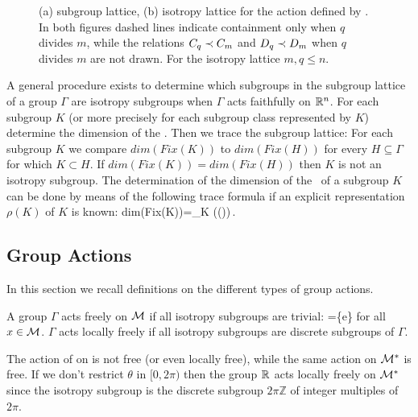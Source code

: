 \begin{example}
\begin{figure}
\begin{center}
\end{center}
\caption[O(2) lattices]{
    {\small
    (a)  subgroup lattice, (b)  isotropy lattice for the action
	defined by . In both figures dashed lines indicate
	containment only when $q$ divides $m$, while the relations $C_{q}\prec C_{m}$
	and $D_{q}\prec D_{m}$ when $q$ divides $m$ are not drawn. For the isotropy lattice $m,q\le n$.
	}}
\label{fig:O2lattice}
    \vspace*{-5pt}
\end{figure}

\end{example}

A general procedure exists \cite{gatermannHab} to determine which subgroups in the subgroup lattice of a group $\Gamma$ are isotropy
subgroups when $\Gamma$ acts faithfully on $\mathbb{R}^{n}$.
For each subgroup $K$ (or more precisely for each subgroup class represented by $K$)
determine the dimension of the \fixedsp. Then we trace the subgroup lattice: For each subgroup
$K$ we compare $dim(Fix(K))$ to $dim(Fix(H))$ for every $H\subseteq\Gamma$ for which $K\subset H$.
If  $dim(Fix(K))=dim(Fix(H))$ then $K$ is not an isotropy subgroup. The determination of the dimension of the
\fixedsp\ of a subgroup $K$ can be done by means of the following trace formula if an explicit representation
$\rho(K)$ of $K$ is known:
\beq
	dim(Fix(K))=\sum_{\kappa\in K} \trace(\rho(\kappa))\,.
\eeq

\subsection{Group Actions}

In this section we recall definitions on the different types of group actions.

\begin{definition}
\label{def:free}
A group $\Gamma$ acts freely on $\mathcal{M}$ if all isotropy subgroups are trivial: =\{e\} for all $x\in \mathcal{M}$.
$\Gamma$ acts locally freely if all isotropy subgroups are discrete subgroups of $\Gamma$.
\end{definition}

\begin{example}
The action  of  on  is not free (or even locally free), while the same action on $\mathcal{M}^*$ is free. If we don't
restrict $\theta$ in $[0,2\pi)$ then the group $\mathbb{R}^{}$ acts locally freely on $\mathcal{M}^*$
since the isotropy subgroup is the discrete subgroup $2\pi\mathbb{Z}$ of integer multiples of $2\pi$.
\end{example}

